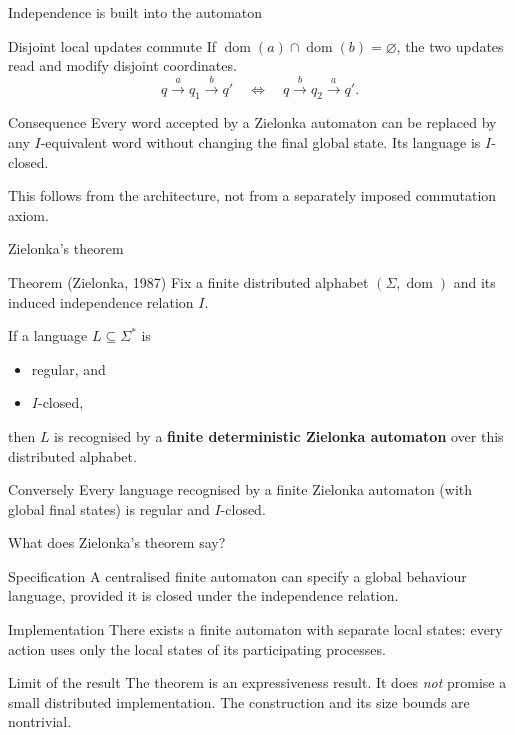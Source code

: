 \documentclass[t,11pt]{beamer}
\newcommand{\domn}{\operatorname{dom}}
\begin{document}
\begin{frame}{Independence is built into the automaton}
  \begin{block}{Disjoint local updates commute}
    If $\domn(a)\cap\domn(b)=\varnothing$, the two updates read and modify disjoint coordinates.
    \[
       q\xrightarrow{a}q_1\xrightarrow{b}q'
       \quad\Longleftrightarrow\quad
       q\xrightarrow{b}q_2\xrightarrow{a}q'.
    \]
  \end{block}
  \begin{block}{Consequence}
    Every word accepted by a Zielonka automaton can be replaced by any $I$-equivalent word without changing the final global state. Its language is $I$-closed.
  \end{block}
  \vspace{0.15cm}
  This follows from the architecture, not from a separately imposed commutation axiom.
\end{frame}

\begin{frame}{Zielonka's theorem}
  \begin{block}{Theorem (Zielonka, 1987)}
    Fix a finite distributed alphabet $(\Sigma,\domn)$ and its induced independence relation $I$.

    If a language $L\subseteq\Sigma^*$ is
    \begin{itemize}
      \item regular, and
      \item $I$-closed,
    \end{itemize}
    then $L$ is recognised by a \textbf{finite deterministic Zielonka automaton} over this distributed alphabet.
  \end{block}
  \begin{block}{Conversely}
    Every language recognised by a finite Zielonka automaton (with global final states) is regular and $I$-closed.
  \end{block}
\end{frame}



\begin{frame}{What does Zielonka's theorem say?}
  \begin{block}{Specification}
    A centralised finite automaton can specify a global behaviour language, provided it is closed under the independence relation.
  \end{block}
  \begin{block}{Implementation}
    There exists a finite automaton with separate local states: every action uses only the local states of its participating processes.
  \end{block}
  \begin{block}{Limit of the result}
    The theorem is an expressiveness result. It does \emph{not} promise a small distributed implementation. The construction and its size bounds are nontrivial.
  \end{block}
\end{frame}
\end{document}
